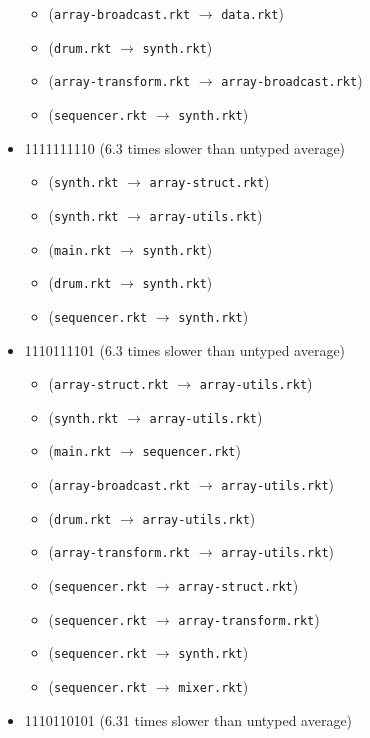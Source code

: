 \documentclass{article}
\newcommand{\mono}[1]{\texttt{#1}}
\begin{document}
\begin{itemize}
\begin{itemize}
  \item (\mono{array-broadcast.rkt} $\rightarrow$ \mono{data.rkt})
  \item (\mono{drum.rkt} $\rightarrow$ \mono{synth.rkt})
  \item (\mono{array-transform.rkt} $\rightarrow$ \mono{array-broadcast.rkt})
  \item (\mono{sequencer.rkt} $\rightarrow$ \mono{synth.rkt})
  \end{itemize}
\item 1111111110 (6.3 times slower than untyped average)
  \begin{itemize}
  \item (\mono{synth.rkt} $\rightarrow$ \mono{array-struct.rkt})
  \item (\mono{synth.rkt} $\rightarrow$ \mono{array-utils.rkt})
  \item (\mono{main.rkt} $\rightarrow$ \mono{synth.rkt})
  \item (\mono{drum.rkt} $\rightarrow$ \mono{synth.rkt})
  \item (\mono{sequencer.rkt} $\rightarrow$ \mono{synth.rkt})
  \end{itemize}
\item 1110111101 (6.3 times slower than untyped average)
  \begin{itemize}
  \item (\mono{array-struct.rkt} $\rightarrow$ \mono{array-utils.rkt})
  \item (\mono{synth.rkt} $\rightarrow$ \mono{array-utils.rkt})
  \item (\mono{main.rkt} $\rightarrow$ \mono{sequencer.rkt})
  \item (\mono{array-broadcast.rkt} $\rightarrow$ \mono{array-utils.rkt})
  \item (\mono{drum.rkt} $\rightarrow$ \mono{array-utils.rkt})
  \item (\mono{array-transform.rkt} $\rightarrow$ \mono{array-utils.rkt})
  \item (\mono{sequencer.rkt} $\rightarrow$ \mono{array-struct.rkt})
  \item (\mono{sequencer.rkt} $\rightarrow$ \mono{array-transform.rkt})
  \item (\mono{sequencer.rkt} $\rightarrow$ \mono{synth.rkt})
  \item (\mono{sequencer.rkt} $\rightarrow$ \mono{mixer.rkt})
  \end{itemize}
\item 1110110101 (6.31 times slower than untyped average)
  \begin{itemize}

\end{itemize}
\end{itemize}
\end{document}
